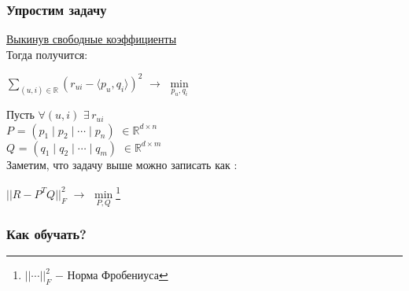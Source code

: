         \subsubsection{Упростим задачу}
            \underline{Выкинув свободные коэффициенты}\\

            Тогда получится:
            \begin{center}
            \Large
                $\sum\limits_{(u, i) \in \mathbb{R}}(r_{ui} - \langle p_u, q_i \rangle)^2$ $\longrightarrow$ $\min\limits_{p_u, q_i}$
            \end{center}

            Пусть $\forall (u, i)$ $\exists \, r_{ui}$\\

            $P$ = $(p_1 \mid p_2 \mid \cdots \mid p_n)$ $\in \mathbb{R}^{d \times n}$\\

            $Q$ = $(q_1 \mid q_2 \mid \cdots \mid q_m)$ $\in \mathbb{R}^{d \times m}$\\

            Заметим, что задачу выше можно записать как :
            \begin{center}
            \Large
                $||R - P^TQ||_F^2$ $\longrightarrow$ $\min\limits_{P, Q}$\footnote{$|| \cdots ||_F^2$ $-$ Норма Фробениуса}
            \end{center}

            \subsubsection{Как обучать?}

